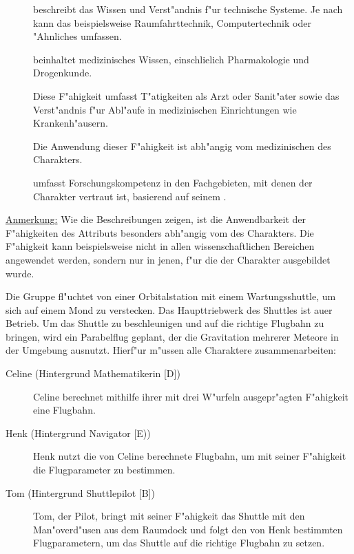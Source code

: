 \begin{description}
    \item[]  beschreibt das Wissen und Verst"andnis f"ur technische Systeme. Je nach  kann das beispielsweise Raumfahrttechnik, Computertechnik oder "Ahnliches umfassen.
    \item[]  beinhaltet medizinisches Wissen, einschlie\3lich Pharmakologie und Drogenkunde. 
    
        Diese F"ahigkeit umfasst T"atigkeiten als Arzt oder Sanit"ater sowie das Verst"andnis f"ur Abl"aufe in medizinischen Einrichtungen wie Krankenh"ausern. 
        
        Die Anwendung dieser F"ahigkeit ist abh"angig vom medizinischen  des Charakters.
    \item[]  umfasst Forschungskompetenz in den Fachgebieten, mit denen der Charakter vertraut ist, basierend 
        auf seinem .
\end{description}

\underline{Anmerkung:} Wie die Beschreibungen zeigen, ist die Anwendbarkeit der F"ahigkeiten des Attributs  besonders abh"angig vom  des Charakters. Die F"ahigkeit  kann beispielsweise nicht in allen wissenschaftlichen Bereichen angewendet werden, sondern nur in jenen, f"ur die der Charakter ausgebildet wurde.

\medskip
\begin{ruleexample}
    Die Gruppe fl"uchtet von einer Orbitalstation mit einem Wartungsshuttle, um sich auf einem Mond zu verstecken. Das Haupttriebwerk des Shuttles ist au\3er Betrieb. Um das Shuttle zu beschleunigen und auf die richtige Flugbahn zu bringen, wird ein Parabelflug geplant, der die Gravitation mehrerer Meteore in der Umgebung ausnutzt. Hierf"ur m"ussen alle Charaktere zusammenarbeiten:

\begin{description}
        \item[Celine ({Hintergrund Mathematikerin [D]})] Celine berechnet mithilfe ihrer mit drei W"urfeln ausgepr"agten F"ahigkeit 
             eine Flugbahn.
        \item[Henk ({Hintergrund Navigator [E)})] Henk nutzt die von Celine berechnete Flugbahn, um mit seiner F"ahigkeit  
            die Flugparameter zu bestimmen.
        \item[Tom ({Hintergrund Shuttlepilot [B]})] Tom, der Pilot, bringt mit seiner F"ahigkeit  das Shuttle mit den 
            Man"overd"usen aus dem Raumdock und folgt den von Henk bestimmten Flugparametern, um das Shuttle auf die richtige Flugbahn zu setzen.
    \end{description}
\end{ruleexample}

